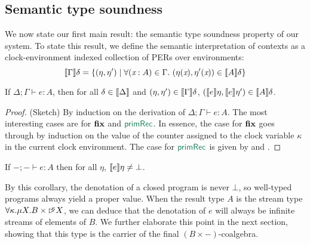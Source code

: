 \subsection{Semantic type soundness}
\label{sec:semantic-soundness}

We now state our first main result: the semantic type soundness
property of our system. To state this result, we define the semantic
interpretation of contexts as a clock-environment indexed collection
of PERs over environments:
\begin{displaymath}
  \sem{\Gamma}\delta = \{(\eta, \eta') \mathrel| \forall (\ident{x} : A) \in \Gamma.\ (\eta(\ident{x}), \eta'(\ident{x})) \in \sem{A}\delta \}
\end{displaymath}

\begin{theorem}\label{thm:semantic-soundness}
  If $\Delta; \Gamma \vdash e : A$, then for all $\delta \in
  \llbracket \Delta \rrbracket$ and $(\eta,\eta') \in \llbracket \Gamma \rrbracket\delta$,
  $(\llbracket e \rrbracket\eta,\llbracket e \rrbracket\eta') \in \llbracket A \rrbracket\delta$.
\end{theorem}

\begin{proof}
  (Sketch) By induction on the derivation of $\Delta; \Gamma \vdash e
  : A$. The most interesting cases are for $\textbf{fix}$ and
  $\elim{primRec}$. In essence, the case for $\textbf{fix}$ goes through
  by induction on the value of the counter assigned to the clock
  variable $\kappa$ in the current clock environment. The case for
  $\elim{primRec}$ is given by  and
  .
\end{proof}

\begin{corollary}
  If $-; - \vdash e : A$ then for all $\eta$, $\llbracket e \rrbracket\eta \not=
  \bot$.
\end{corollary}
By this corollary, the denotation of a closed program is never $\bot$,
so well-typed programs always yield a proper value.  When the result
type $A$ is the stream type $\forall \kappa. \mu X. B \times
\mathord{\rhd\kern-0.4em^{\kappa}} X$, we can deduce that the denotation of $e$ will always
be infinite streams of elements of $B$. We further elaborate this
point in the next section, showing that this type is the carrier of
the final $(B \times -)$-coalgebra.


